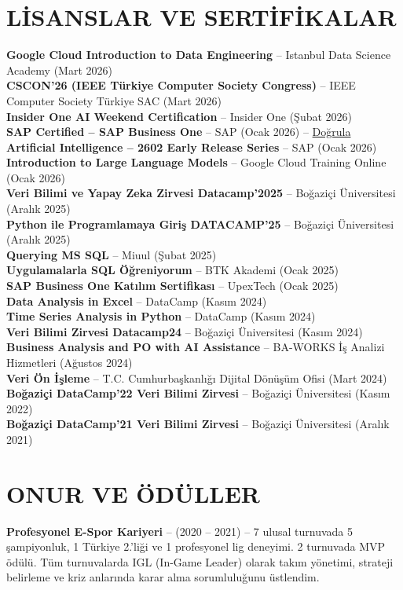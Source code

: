 \documentclass[a4paper,8pt]{article}
\begin{document}
\section{LİSANSLAR VE SERTİFİKALAR}
{\small
\textbf{Google Cloud Introduction to Data Engineering} -- Istanbul Data Science Academy (Mart 2026)\\
\textbf{CSCON'26 (IEEE Türkiye Computer Society Congress)} -- IEEE Computer Society Türkiye SAC (Mart 2026)\\
\textbf{Insider One AI Weekend Certification} -- Insider One (Şubat 2026)\\
\textbf{SAP Certified -- SAP Business One} -- SAP (Ocak 2026) -- \href{https://www.credly.com/badges/149da554-e1b6-477d-a063-f3c7997625c2/linked_in_profile}{Doğrula}\\
\textbf{Artificial Intelligence -- 2602 Early Release Series} -- SAP (Ocak 2026)\\
\textbf{Introduction to Large Language Models} -- Google Cloud Training Online (Ocak 2026)\\
\textbf{Veri Bilimi ve Yapay Zeka Zirvesi Datacamp'2025} -- Boğaziçi Üniversitesi (Aralık 2025)\\
\textbf{Python ile Programlamaya Giriş DATACAMP'25} -- Boğaziçi Üniversitesi (Aralık 2025)\\
\textbf{Querying MS SQL} -- Miuul (Şubat 2025)\\
\textbf{Uygulamalarla SQL Öğreniyorum} -- BTK Akademi (Ocak 2025)\\
\textbf{SAP Business One Katılım Sertifikası} -- UpexTech (Ocak 2025)\\
\textbf{Data Analysis in Excel} -- DataCamp (Kasım 2024)\\
\textbf{Time Series Analysis in Python} -- DataCamp (Kasım 2024)\\
\textbf{Veri Bilimi Zirvesi Datacamp24} -- Boğaziçi Üniversitesi (Kasım 2024)\\
\textbf{Business Analysis and PO with AI Assistance} -- BA-WORKS İş Analizi Hizmetleri (Ağustos 2024)\\
\textbf{Veri Ön İşleme} -- T.C. Cumhurbaşkanlığı Dijital Dönüşüm Ofisi (Mart 2024)\\
\textbf{Boğaziçi DataCamp'22 Veri Bilimi Zirvesi} -- Boğaziçi Üniversitesi (Kasım 2022)\\
\textbf{Boğaziçi DataCamp'21 Veri Bilimi Zirvesi} -- Boğaziçi Üniversitesi (Aralık 2021)
}

\section{ONUR VE ÖDÜLLER}
{\small
\textbf{Profesyonel E-Spor Kariyeri} -- (2020 -- 2021) -- 7 ulusal turnuvada 5 şampiyonluk, 1 Türkiye 2.'liği ve 1 profesyonel lig deneyimi. 2 turnuvada MVP ödülü. Tüm turnuvalarda IGL (In-Game Leader) olarak takım yönetimi, strateji belirleme ve kriz anlarında karar alma sorumluluğunu üstlendim.
}
\end{document}
